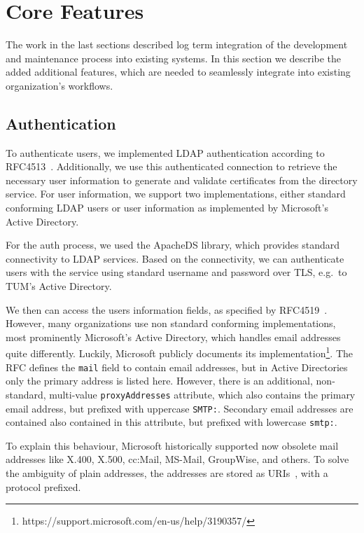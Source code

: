 \section{Core Features}\label{sec:coreFeatures}

The work in the last sections described log term integration of the development and maintenance process into existing
systems.
In this section we describe the added additional features, which are needed to seamlessly integrate into existing
organization's workflows.

\subsection*{Authentication}
To authenticate users, we implemented LDAP authentication according to RFC4513~\cite{RFC4513}.
Additionally, we use this authenticated connection to retrieve the necessary user information to generate and validate
certificates from the directory service.
For user information, we support two implementations, either standard conforming LDAP users or user information as
implemented by Microsoft's Active Directory.

For the auth process, we used the ApacheDS library, which provides standard connectivity to LDAP services.
Based on the connectivity, we can authenticate users with the service using standard username and password over TLS,
e.g.\ to TUM's Active Directory.

We then can access the users information fields, as specified by RFC4519~\cite{RFC4519}.
However, many organizations use non standard conforming implementations, most prominently Microsoft's Active Directory,
which handles email addresses quite differently.
Luckily, Microsoft publicly documents its implementation\footnote{https://support.microsoft.com/en-us/help/3190357/}.
The RFC defines the \lstinline{mail} field to contain email addresses, but in Active Directories only the primary
address is listed here.
However, there is an additional, non-standard, multi-value \lstinline{proxyAddresses} attribute, which also contains the
primary email address, but prefixed with uppercase \lstinline{SMTP:}.
Secondary email addresses are contained also contained in this attribute, but prefixed with lowercase \lstinline{smtp:}.

To explain this behaviour, Microsoft historically supported now obsolete mail addresses like X.400, X.500, cc:Mail,
MS-Mail, GroupWise, and others.
To solve the ambiguity of plain addresses, the addresses are stored as URIs~\cite{RFC3986}, with a protocol prefixed.

